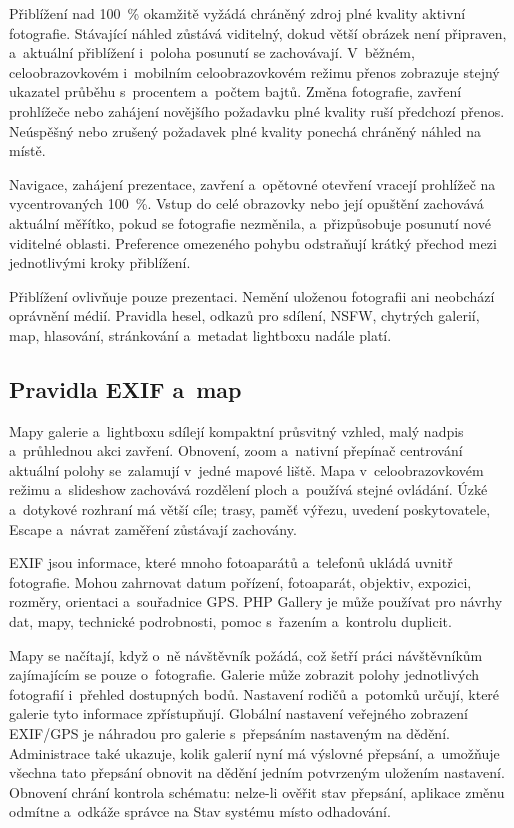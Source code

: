 \documentclass[11pt,a4paper]{article}
\begin{document}
Přiblížení nad 100~\% okamžitě vyžádá chráněný zdroj plné kvality aktivní
fotografie. Stávající náhled zůstává viditelný, dokud větší obrázek není
připraven, a~aktuální přiblížení i~poloha posunutí se zachovávají. V~běžném,
celoobrazovkovém i~mobilním celoobrazovkovém režimu přenos zobrazuje stejný
ukazatel průběhu s~procentem a~počtem bajtů. Změna fotografie, zavření
prohlížeče nebo zahájení novějšího požadavku plné kvality ruší předchozí přenos.
Neúspěšný nebo zrušený požadavek plné kvality ponechá chráněný náhled na místě.

Navigace, zahájení prezentace, zavření a~opětovné otevření vracejí prohlížeč na
vycentrovaných 100~\%. Vstup do celé obrazovky nebo její opuštění zachovává
aktuální měřítko, pokud se fotografie nezměnila, a~přizpůsobuje posunutí nové
viditelné oblasti. Preference omezeného pohybu odstraňují krátký přechod mezi
jednotlivými kroky přiblížení.

Přiblížení ovlivňuje pouze prezentaci. Nemění uloženou fotografii ani neobchází
oprávnění médií. Pravidla hesel, odkazů pro sdílení, NSFW, chytrých galerií,
map, hlasování, stránkování a~metadat lightboxu nadále platí.

\subsection{Pravidla EXIF a~map}

Mapy galerie a~lightboxu sdílejí kompaktní průsvitný vzhled, malý nadpis
a~průhlednou akci zavření. Obnovení, zoom a~nativní přepínač centrování
aktuální polohy se~zalamují v~jedné mapové liště. Mapa v~celoobrazovkovém
režimu a~slideshow zachovává rozdělení ploch a~používá stejné ovládání.
Úzké a~dotykové rozhraní má větší cíle; trasy, paměť výřezu, uvedení
poskytovatele, Escape a~návrat zaměření zůstávají zachovány.

EXIF jsou informace, které mnoho fotoaparátů a~telefonů ukládá uvnitř
fotografie. Mohou zahrnovat datum pořízení, fotoaparát, objektiv, expozici,
rozměry, orientaci a~souřadnice GPS. PHP Gallery je může používat pro návrhy
dat, mapy, technické podrobnosti, pomoc s~řazením a~kontrolu duplicit.

Mapy se načítají, když o~ně návštěvník požádá, což šetří práci návštěvníkům
zajímajícím se pouze o~fotografie. Galerie může zobrazit polohy jednotlivých
fotografií i~přehled dostupných bodů. Nastavení rodičů a~potomků určují, které
galerie tyto informace zpřístupňují. Globální nastavení veřejného zobrazení
EXIF/GPS je náhradou pro galerie s~přepsáním nastaveným na dědění. Administrace
také ukazuje, kolik galerií nyní má výslovné přepsání, a~umožňuje všechna tato
přepsání obnovit na dědění jedním potvrzeným uložením nastavení. Obnovení chrání
kontrola schématu: nelze-li ověřit stav přepsání, aplikace změnu odmítne
a~odkáže správce na Stav systému místo odhadování.
\end{document}
